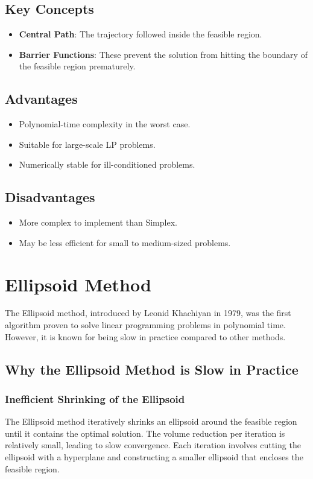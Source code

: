 \documentclass{article}
\begin{document}
\subsection{Key Concepts}
\begin{itemize}
    \item \textbf{Central Path}: The trajectory followed inside the feasible region.
    \item \textbf{Barrier Functions}: These prevent the solution from hitting the boundary of the feasible region prematurely.
\end{itemize}

\subsection{Advantages}
\begin{itemize}
    \item Polynomial-time complexity in the worst case.
    \item Suitable for large-scale LP problems.
    \item Numerically stable for ill-conditioned problems.
\end{itemize}

\subsection{Disadvantages}
\begin{itemize}
    \item More complex to implement than Simplex.
    \item May be less efficient for small to medium-sized problems.
\end{itemize}

\section{Ellipsoid Method}
The Ellipsoid method, introduced by Leonid Khachiyan in 1979, was the first algorithm proven to solve linear programming problems in polynomial time. However, it is known for being slow in practice compared to other methods.

\subsection{Why the Ellipsoid Method is Slow in Practice}

\subsubsection{Inefficient Shrinking of the Ellipsoid}
The Ellipsoid method iteratively shrinks an ellipsoid around the feasible region until it contains the optimal solution. The volume reduction per iteration is relatively small, leading to slow convergence. Each iteration involves cutting the ellipsoid with a hyperplane and constructing a smaller ellipsoid that encloses the feasible region.
\end{document}
